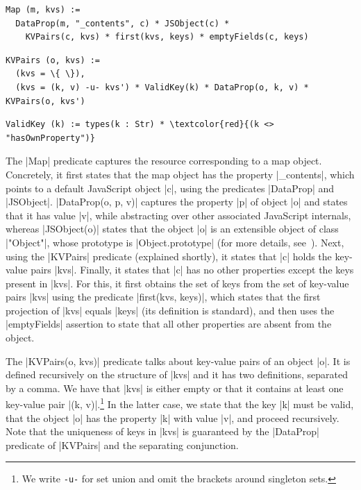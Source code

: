 \begin{Verbatim}[fontsize=\footnotesize,commandchars=\\\{\}]
Map (m, kvs) := 
  DataProp(m, "_contents", c) * JSObject(c) * 
    KVPairs(c, kvs) * first(kvs, keys) * emptyFields(c, keys)
\end{Verbatim}
 \begin{Verbatim}[fontsize=\footnotesize,commandchars=\\\{\}]
KVPairs (o, kvs) := 
  (kvs = \{ \}),
  (kvs = (k, v) -u- kvs') * ValidKey(k) * DataProp(o, k, v) * KVPairs(o, kvs')
\end{Verbatim}
\begin{Verbatim}[fontsize=\footnotesize,commandchars=\\\{\}]
ValidKey (k) := types(k : Str) * \textcolor{red}{(k <> "hasOwnProperty")}
\end{Verbatim}

The \jsinline|Map| predicate captures the resource corresponding to a map object. 
Concretely, it first states that the map object has the property \jsinline|_contents|, which points to a default JavaScript object \jsinline|c|, using the predicates \jsinline|DataProp| and \jsinline|JSObject|. 
\jsinline|DataProp(o, p, v)| captures the property \jsinline|p| of object \jsinline|o| and states that it has value \jsinline|v|, while abstracting over other associated JavaScript internals, whereas \jsinline|JSObject(o)| states that the object \jsinline|o| is an extensible object of class \jsinline|"Object"|, whose prototype is \jsinline|Object.prototype| (for more details, see~\cite{javert}). 
Next, using the \jsinline|KVPairs| predicate (explained shortly), it states that \jsinline|c| holds the key-value pairs \jsinline|kvs|. Finally, it states that \jsinline|c| has no other properties except the keys present in \jsinline|kvs|. For this, it first obtains the set of keys from the set of key-value pairs \jsinline|kvs| using the predicate \jsinline|first(kvs, keys)|, which states that the first projection of \jsinline|kvs| equals \jsinline|keys| (its definition is standard), and then uses the \jsinline|emptyFields| assertion to state that all other properties are absent from the object.

The \jsinline|KVPairs(o, kvs)| predicate talks about key-value pairs of an object \jsinline|o|. 
It is defined recursively on the structure of \jsinline|kvs| and it has two definitions, separated by a comma. 
We have that \jsinline|kvs| is either empty or that it contains at least one key-value pair \jsinline|(k, v)|.\footnote{We write {\small\texttt{-u-}} for set union and omit the brackets around singleton sets.} 
In the latter case, we state that the key \jsinline|k| must be valid, that the object \jsinline|o| has the property \jsinline|k| with value \jsinline|v|, and proceed recursively.
Note that the uniqueness of keys in \jsinline|kvs| is guaranteed by the \jsinline|DataProp| predicate of \jsinline|KVPairs| and the separating conjunction.

